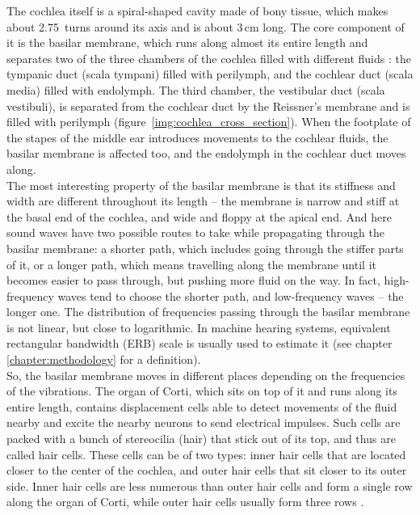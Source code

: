 The cochlea itself is a spiral-shaped cavity made of bony tissue, which makes about 2.75~turns around its axis and is about 3\,cm long. The core component of it is the basilar membrane, which runs along almost its entire length and separates two of the three chambers of the cochlea filled with different fluids \cite{Schnupp2011}: the tympanic duct (scala tympani) filled with perilymph, and the cochlear duct (scala media) filled with endolymph. The third chamber, the vestibular duct (scala vestibuli), is separated from the cochlear duct by the Reissner’s membrane and is filled with peri\-lymph (figure~\ref{img:cochlea_cross_section}). When the footplate of the stapes of the middle ear introduces movements to the cochlear fluids, the basilar membrane is affected too, and the endolymph in the cochlear duct moves along.\\

The most interesting property of the basilar membrane is that its stiffness and width are different throughout its length – the membrane is narrow and stiff at the basal end of the cochlea, and wide and floppy at the apical end. And here sound waves have two possible routes to take while propagating through the basilar membrane: a shorter path, which includes going through the stiffer parts of it, or a longer path, which means travelling along the membrane until it becomes easier to pass through, but pushing more fluid on the way. In fact, high-frequency waves tend to choose the shorter path, and low-frequency waves – the longer one. The distribution of frequencies passing through the basilar membrane is not linear, but close to logarithmic. In machine hearing systems, equivalent rectangular bandwidth (ERB) scale is usually used to estimate it (see chapter \ref{chapter:methodology} for a definition).\\

So, the basilar membrane moves in different places depending on the frequencies of the vibrations. The organ of Corti, which sits on top of it and runs along its entire length, contains displacement cells able to detect movements of the fluid nearby and excite the nearby neurons to send electrical impulses. Such cells are packed with a bunch of stereocilia (hair) that stick out of its top, and thus are called hair cells. These cells can be of two types: inner hair cells that are located closer to the center of the cochlea, and outer hair cells that sit closer to its outer side. Inner hair cells are less numerous than outer hair cells and form a single row along the organ of Corti, while outer hair cells usually form three rows \cite{Schnupp2011}.\\


